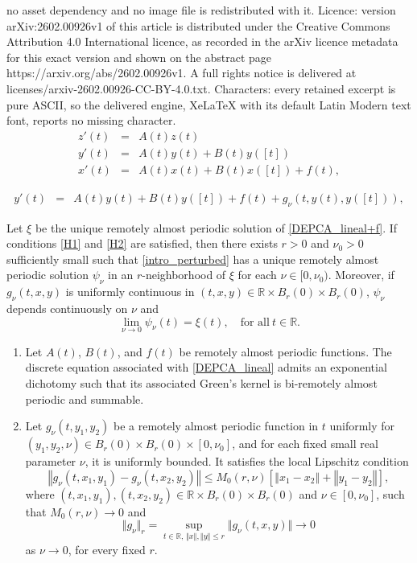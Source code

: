 \documentclass[10pt,a4paper]{amsart}
\begin{document}
no asset dependency and no image file is redistributed with it. Licence: version arXiv:2602.00926v1 of this article is distributed under the Creative Commons Attribution 4.0 International licence, as recorded in the arXiv licence metadata for this exact version and shown on the abstract page https://arxiv.org/abs/2602.00926v1. A full rights notice is delivered at licenses/arxiv-2602.00926-CC-BY-4.0.txt. Characters: every retained excerpt is pure ASCII, so the delivered engine, XeLaTeX with its default Latin Modern text font, reports no missing character.
\begin{eqnarray}
z'(t)&=& A(t)z(t) \label{DEPCA_A}\\
y'(t)&=& A(t)y(t)+B(t)y([t]) \label{DEPCA_lineal}\\
x'(t)&=& A(t)x(t)+B(t)x([t])+f(t), \label{DEPCA_lineal+f}
\end{eqnarray}

\begin{eqnarray}
y'(t) &=& A(t)y(t) + B(t)y([t]) + f(t) + g_{\nu}(t, y(t), y([t])), \label{intro_perturbed}
\end{eqnarray}

\begin{thm}\label{teo_perturbada_depca}
Let $\xi$ be the unique remotely almost periodic solution of \eqref{DEPCA_lineal+f}.  
If conditions \ref{H1} and \ref{H2} are satisfied,  
then there exists $r > 0$ and $\nu_0 > 0$ sufficiently small such that \eqref{intro_perturbed}  
has a unique remotely almost periodic solution $\psi_\nu$ in an $r$-neighborhood of $\xi$  
for each $\nu \in [0, \nu_0)$.  
Moreover, if $g_\nu(t, x, y)$ is uniformly continuous in $(t, x, y) \in \mathbb{R} \times B_r(0) \times B_r(0)$,  
 $\psi_\nu$ depends continuously on $\nu$ and  
\[
\lim_{\nu \to 0} \psi_\nu(t) = \xi(t), \quad \mbox{for all}~{} t\in\mathbb{R}.
\]
\end{thm}

\begin{enumerate}[label=\textbf{(H.\arabic*)}]
\item\label{H1} Let $A(t)$, $B(t)$, and $f(t)$ be remotely almost periodic functions.  
The discrete equation associated with \eqref{DEPCA_lineal} admits an exponential dichotomy such that its associated Green's kernel is bi-remotely almost periodic and summable.

\item\label{H2} Let $g_{\nu}(t, y_1, y_2)$ be a remotely almost periodic function in $t$  
uniformly for $(y_1, y_2, \nu) \in B_r(0) \times B_r(0) \times [0, \nu_0]$,  
and for each fixed small real parameter $\nu$, it is uniformly bounded.  
It satisfies the local Lipschitz condition  
\[
\left\Vert g_{\nu}(t, x_1, y_1) - g_{\nu}(t, x_2, y_2) \right\Vert \leq M_0(r, \nu) \left[ \left\Vert x_1 - x_2 \right\Vert + \left\Vert y_1 - y_2 \right\Vert \right],
\]
where $(t, x_1, y_1), (t, x_2, y_2) \in \mathbb{R} \times B_r(0) \times B_r(0)$ and $\nu \in [0, \nu_0]$,  
such that $M_0(r, \nu) \to 0$ and  
\[
\Vert g_{\nu} \Vert_r = \sup_{t \in \mathbb{R},\, \Vert x \Vert, \Vert y \Vert \leq r} \Vert g_\nu(t, x, y) \Vert \to 0
\]  
as $\nu \to 0$, for every fixed $r$.
\end{enumerate}
\end{document}
